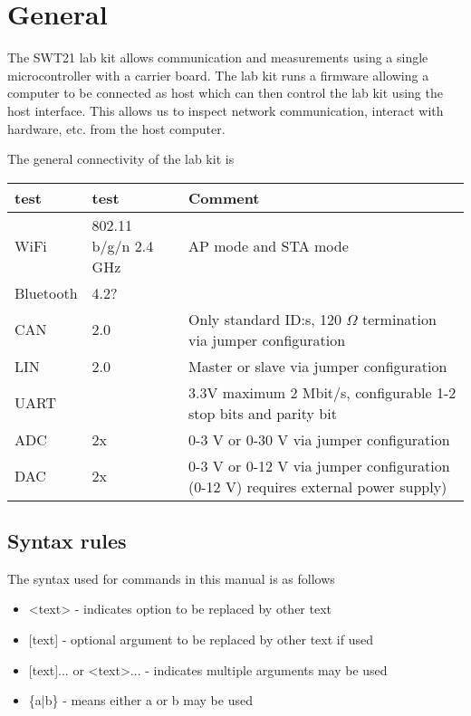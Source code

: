 \documentclass{article}[a4paper]
\begin{document}
\section{General}

The SWT21 lab kit allows communication and measurements using a single
microcontroller with a carrier board. The lab kit runs a firmware allowing a
computer to be connected as host which can then control the lab kit using the
host interface. This allows us to inspect network communication, interact with
hardware, etc. from the host computer.

The general connectivity of the lab kit is

\medskip
\renewcommand{\arraystretch}{1.5}
\begin{tabular}{|p{2cm}|p{1.5cm}|p{7cm}|}
\hline
test & test & Comment \\
\hline
WiFi & 802.11 b/g/n 2.4 GHz & AP mode and STA mode \\
\hline
Bluetooth & 4.2? & \\
\hline
CAN & 2.0 & Only standard ID:s, 120 $\Omega$ termination via jumper configuration \\
\hline
LIN & 2.0 & Master or slave via jumper configuration \\
\hline
UART & & 3.3V maximum 2 Mbit/s, configurable 1-2 stop bits and parity bit \\
\hline
ADC & 2x & 0-3 V or 0-30 V via jumper configuration \\
\hline
DAC & 2x & 0-3 V or 0-12 V via jumper configuration (0-12 V) requires external power supply)\\
\hline
\end{tabular}


\subsection{Syntax rules}
The syntax used for commands in this manual is as follows

\begin{itemize}
\item <text> - indicates option to be replaced by other text
\item{[text] - optional argument to be replaced by other text if used}
\item{[text]... or <text>... - indicates multiple arguments may be used}
\item \{a|b\} - means either a or b may be used
\end{itemize}
\end{document}
